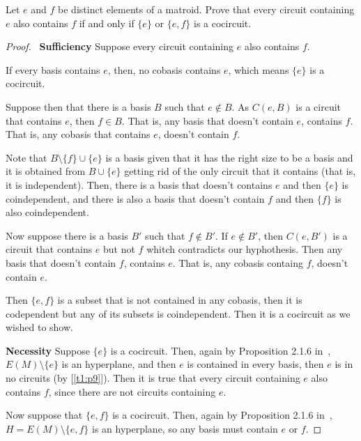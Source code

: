 \prob
{
    Let $e$ and $f$ be distinct elements of a matroid. Prove that every circuit containing $e$ also contains $f$ if and only if 
    $\{e\}$ or $\{e, f\}$ is a cocircuit.
}
\begin{proof}
    $\,$\pn
    \textbf{Sufficiency}\pn
        Suppose every circuit containing $e$ also contains $f$.\pn 
        
        If every basis contains $e$, then, no cobasis contains $e$, which means $\{e\}$ is a
        cocircuit.\pn
        
        Suppose then that there is a basis $B$ such that $e \notin B$. As $C(e, B)$ is a circuit that contains $e$, then
        $f \in B$. That is, any basis that doesn't contain $e$, contains $f$. That is, any cobasis that contains $e$, doesn't 
        contain $f$.\pn 
        
        Note that $B \setminus \{f\} \cup \{e\}$ is a basis given that it has the right size to be a basis and
        it is obtained from $B \cup \{e\}$ getting rid of the only circuit that it contains (that is, it is independent). Then, there
        is a basis that doesn't contains $e$ and then $\{e\}$ is coindependent, and there is also a basis that doesn't contain $f$ and then
        $\{f\}$ is also coindependent.\pn
        
        Now suppose there is a basis $B'$ such that $f \notin B'$. If $e \notin B'$, then $C(e, B')$ is a circuit that contains
        $e$ but not $f$ whitch contradicts our hyphothesis. Then any basis that doesn't contain $f$, contains $e$. That is,
        any cobasis containg $f$, doesn't contain $e$.\pn
        
        Then $\{e, f\}$ is a subset that is not contained in any cobasis, then it is codependent but any of its subsets is coindependent.
        Then it is a cocircuit as we wished to show.\pn
        
    \textbf{Necessity}\pn
        Suppose $\{e\}$ is a cocircuit. Then, again by Proposition 2.1.6 in~\cite{Oxley}, $E(M) \setminus \{e\}$ is an hyperplane, and then
        $e$ is contained in every basis, then $e$ is in no circuits (by [\ref{t1:p9}]). Then it is true that every circuit containing $e$
        also contains $f$, since there are not circuits containing $e$.\pn
        
        Now suppose that $\{e, f\}$ is a cocircuit. Then, again by Proposition 2.1.6 in~\cite{Oxley}, $H = E(M) \setminus \{e, f\}$ is an
        hyperplane, so any basis must contain $e$ or $f$.\pn
        

\end{proof}
